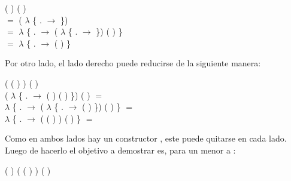 \begin{AgdaAlign}
 (  \AgdaFunction{+} ) ( \AgdaFunction{+} ) \\
$=$  ( $\lambda$ \{ . $\rightarrow$   \AgdaFunction{+}  \})  \\
$=$  $\lambda$ \{ . $\rightarrow$  ( $\lambda$ \{ . $\rightarrow$   \AgdaFunction{+}  \}) ( ) \} \\
$=$  $\lambda$ \{ . $\rightarrow$  (  \AgdaFunction{+} )  \}

Por otro lado, el lado derecho puede reducirse de la siguiente manera:

\begin{flushright}
( ( ) ) \AgdaFunction{+} (  ) \\
( $\lambda$ \{ . $\rightarrow$  ( ) ( ) \}) \AgdaFunction{+} (  ) $=$ \\
 $\lambda$ \{ . $\rightarrow$ ( $\lambda$ \{ . $\rightarrow$  ( )  \}) \AgdaFunction{+} (  ) \} $=$ \\
 $\lambda$ \{ . $\rightarrow$ ( ( ) ) \AgdaFunction{+} (  ) \} $=$
\end{flushright}

Como en ambos lados hay un constructor , este puede quitarse en cada lado. Luego de hacerlo el objetivo a demostrar es, para un  menor a :
\begin{center}
\AgdaFunction{[}  \AgdaFunction{]}  (  \AgdaFunction{+} )  \AgdaFunction{$\leq$} ( ( ) 	) \AgdaFunction{+} (  )
\end{center}


\end{AgdaAlign}
